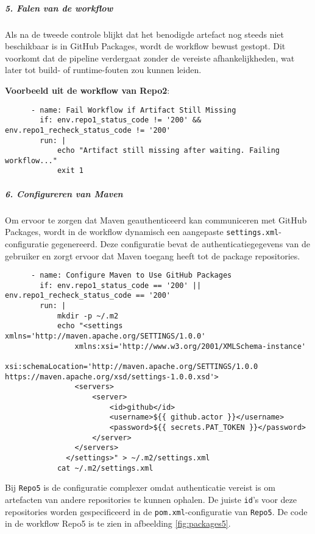 \subparagraph{5. Falen van de workflow}
Als na de tweede controle blijkt dat het benodigde artefact nog steeds niet beschikbaar is in GitHub Packages, wordt de workflow bewust gestopt. Dit voorkomt dat de pipeline verdergaat zonder de vereiste afhankelijkheden, wat later tot build- of runtime-fouten zou kunnen leiden.

\textbf{Voorbeeld uit de workflow van Repo2}:

\begin{verbatim}
      - name: Fail Workflow if Artifact Still Missing
        if: env.repo1_status_code != '200' && env.repo1_recheck_status_code != '200'
        run: |
            echo "Artifact still missing after waiting. Failing workflow..."
            exit 1
\end{verbatim}

\subparagraph{6. Configureren van Maven}
Om ervoor te zorgen dat Maven geauthenticeerd kan communiceren met GitHub Packages, wordt in de workflow dynamisch een aangepaste \texttt{settings.xml}-configuratie gegenereerd. Deze configuratie bevat de authenticatiegegevens van de gebruiker en zorgt ervoor dat Maven toegang heeft tot de package repositories.

\begin{verbatim}
      - name: Configure Maven to Use GitHub Packages
        if: env.repo1_status_code == '200' ||                          env.repo1_recheck_status_code == '200'
        run: |
            mkdir -p ~/.m2
            echo "<settings xmlns='http://maven.apache.org/SETTINGS/1.0.0'
                xmlns:xsi='http://www.w3.org/2001/XMLSchema-instance'
                xsi:schemaLocation='http://maven.apache.org/SETTINGS/1.0.0 https://maven.apache.org/xsd/settings-1.0.0.xsd'>
                <servers>
                    <server>
                        <id>github</id>
                        <username>${{ github.actor }}</username>
                        <password>${{ secrets.PAT_TOKEN }}</password>
                    </server>
                </servers>
              </settings>" > ~/.m2/settings.xml
            cat ~/.m2/settings.xml
\end{verbatim}

Bij \texttt{Repo5} is de configuratie complexer omdat authenticatie vereist is om artefacten van andere repositories te kunnen ophalen. De juiste \texttt{id}'s voor deze repositories worden gespecificeerd in de \texttt{pom.xml}-configuratie van \texttt{Repo5}. De code in de workflow Repo5 is te zien in afbeelding \ref{fig:packages5}.


